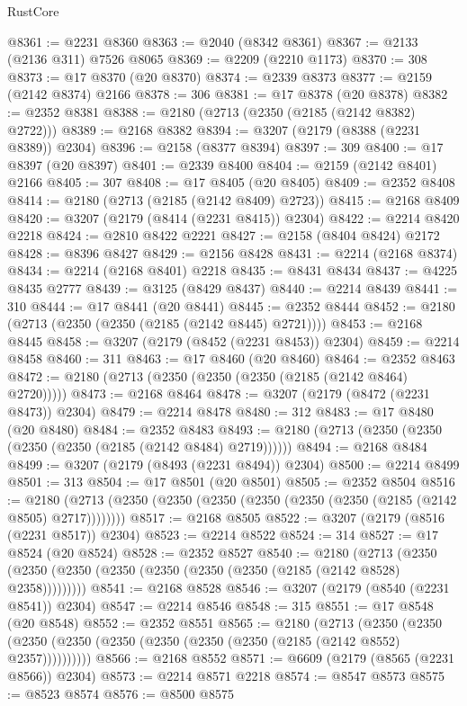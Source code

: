 \begin{lexlean}{RustCore}
\begin{coremodule}
@8361 := @2231 @8360
@8363 := @2040 (@8342 @8361)
@8367 := @2133 (@2136 @311) @7526 @8065
@8369 := @2209 (@2210 @1173)
@8370 := 308
@8373 := @17 @8370 (@20 @8370)
@8374 := @2339 @8373
@8377 := @2159 (@2142 @8374) @2166
@8378 := 306
@8381 := @17 @8378 (@20 @8378)
@8382 := @2352 @8381
@8388 := @2180 (@2713 (@2350 (@2185 (@2142 @8382) @2722)))
@8389 := @2168 @8382
@8394 := @3207 (@2179 (@8388 (@2231 @8389)) @2304)
@8396 := @2158 (@8377 @8394)
@8397 := 309
@8400 := @17 @8397 (@20 @8397)
@8401 := @2339 @8400
@8404 := @2159 (@2142 @8401) @2166
@8405 := 307
@8408 := @17 @8405 (@20 @8405)
@8409 := @2352 @8408
@8414 := @2180 (@2713 (@2185 (@2142 @8409) @2723))
@8415 := @2168 @8409
@8420 := @3207 (@2179 (@8414 (@2231 @8415)) @2304)
@8422 := @2214 @8420 @2218
@8424 := @2810 @8422 @2221
@8427 := @2158 (@8404 @8424) @2172
@8428 := @8396 @8427
@8429 := @2156 @8428
@8431 := @2214 (@2168 @8374)
@8434 := @2214 (@2168 @8401) @2218
@8435 := @8431 @8434
@8437 := @4225 @8435 @2777
@8439 := @3125 (@8429 @8437)
@8440 := @2214 @8439
@8441 := 310
@8444 := @17 @8441 (@20 @8441)
@8445 := @2352 @8444
@8452 := @2180 (@2713 (@2350 (@2350 (@2185 (@2142 @8445) @2721))))
@8453 := @2168 @8445
@8458 := @3207 (@2179 (@8452 (@2231 @8453)) @2304)
@8459 := @2214 @8458
@8460 := 311
@8463 := @17 @8460 (@20 @8460)
@8464 := @2352 @8463
@8472 := @2180 (@2713 (@2350 (@2350 (@2350 (@2185 (@2142 @8464) @2720)))))
@8473 := @2168 @8464
@8478 := @3207 (@2179 (@8472 (@2231 @8473)) @2304)
@8479 := @2214 @8478
@8480 := 312
@8483 := @17 @8480 (@20 @8480)
@8484 := @2352 @8483
@8493 := @2180 (@2713 (@2350 (@2350 (@2350 (@2350 (@2185 (@2142 @8484) @2719))))))
@8494 := @2168 @8484
@8499 := @3207 (@2179 (@8493 (@2231 @8494)) @2304)
@8500 := @2214 @8499
@8501 := 313
@8504 := @17 @8501 (@20 @8501)
@8505 := @2352 @8504
@8516 := @2180 (@2713 (@2350 (@2350 (@2350 (@2350 (@2350 (@2350 (@2185 (@2142 @8505) @2717))))))))
@8517 := @2168 @8505
@8522 := @3207 (@2179 (@8516 (@2231 @8517)) @2304)
@8523 := @2214 @8522
@8524 := 314
@8527 := @17 @8524 (@20 @8524)
@8528 := @2352 @8527
@8540 := @2180
    (@2713 (@2350 (@2350 (@2350 (@2350 (@2350 (@2350 (@2350 (@2185 (@2142 @8528) @2358)))))))))
@8541 := @2168 @8528
@8546 := @3207 (@2179 (@8540 (@2231 @8541)) @2304)
@8547 := @2214 @8546
@8548 := 315
@8551 := @17 @8548 (@20 @8548)
@8552 := @2352 @8551
@8565 := @2180
    (@2713
      (@2350 (@2350 (@2350 (@2350 (@2350 (@2350 (@2350 (@2350 (@2185 (@2142 @8552) @2357))))))))))
@8566 := @2168 @8552
@8571 := @6609 (@2179 (@8565 (@2231 @8566)) @2304)
@8573 := @2214 @8571 @2218
@8574 := @8547 @8573
@8575 := @8523 @8574
@8576 := @8500 @8575

\end{coremodule}
\end{lexlean}
